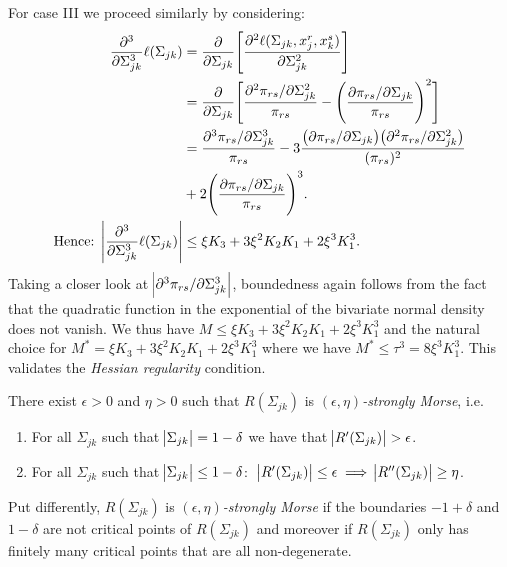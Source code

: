 \begin{condition}
    For case III we proceed similarly by considering:
    \begin{equation}
        \begin{split}
            \frac{\partial^3}{\partial\Sigma_{jk}^3}\ell(\Sigma_{jk}) &= \frac{\partial}{\partial\Sigma_{jk}}\Bigg[\frac{\partial^2 \ell(\Sigma_{jk}, x_j^r,x_k^s)}{\partial \Sigma_{jk}^{2}}\Bigg] \\
            &= \frac{\partial}{\partial\Sigma_{jk}}\Bigg[\frac{\partial^2 \pi_{rs}/\partial \Sigma_{jk}^{2}}{\pi_{rs}} - \Bigg(\frac{\partial \pi_{rs}/\partial \Sigma_{jk}}{\pi_{rs}}\Bigg)^2\Bigg] \\
            &= \frac{\partial^3 \pi_{rs} / \partial \Sigma_{jk}^3}{\pi_{rs}} - 3\frac{\big(\partial \pi_{rs} / \partial \Sigma_{jk}\big)\big( \partial^2 \pi_{rs} / \partial \Sigma_{jk}^2\big)}{(\pi_{rs})^2} \\
            &+ 2\Bigg(\frac{\partial \pi_{rs} / \partial \Sigma_{jk}}{\pi_{rs}}\Bigg)^3. \\
            \text{Hence: } \abs{\frac{\partial^3}{\partial\Sigma_{jk}^3}\ell(\Sigma_{jk})} &\leq \xi K_3 + 3\xi^2K_2K_1 + 2 \xi^3K_1^3.
        \end{split}        
    \end{equation}
    Taking a closer look at $\abs{\partial^3 \pi_{rs} / \partial \Sigma_{jk}^3}$, boundedness again follows from the fact that the quadratic function in the exponential of the bivariate normal density does not vanish. We thus have $M \leq \xi K_3 + 3\xi^2K_2K_1 + 2 \xi^3K_1^3$ and the natural choice for $M^* = \xi K_3 + 3\xi^2K_2K_1 + 2 \xi^3K_1^3$ where we have $M^* \leq \tau^3 = 8\xi^3K_1^3$. This validates the \textit{Hessian regularity} condition.      
    
    \begin{condition}
        There exist $\epsilon > 0$ and $\eta > 0$ such that $R(\Sigma_{jk})$ is $(\epsilon,\eta)$\textit{-strongly Morse}, i.e.
        \begin{enumerate}
            \item For all $\Sigma_{jk}$ such that $\abs{\Sigma_{jk}} = 1-\delta$ we have that $\abs{R^\prime(\Sigma_{jk})} > \epsilon$.
            \item For all $\Sigma_{jk}$ such that $\abs{\Sigma_{jk}} \leq 1-\delta$: $\ \abs{R^\prime(\Sigma_{jk})} \leq \epsilon \implies \abs{R^{\prime\prime}(\Sigma_{jk})} \geq \eta$.
        \end{enumerate}
        Put differently, $R(\Sigma_{jk})$ is $(\epsilon,\eta)$\textit{-strongly Morse} if the boundaries $-1+ \delta$ and $1-\delta$ are not critical points of $R(\Sigma_{jk})$ and moreover if $R(\Sigma_{jk})$ only has finitely many critical points that are all non-degenerate.    
        

\end{condition}
\end{condition}
